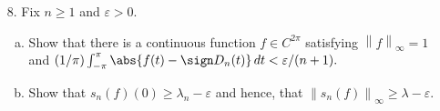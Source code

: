 \documentclass{article}
\begin{document}
\begin{itemize}
\begin{proof}
			Similarly, we have
			\begin{align*}
				b_n &= \frac{1}{\pi} \left( \int_0^{2\pi} \pi^2\sin nx\, dx - 2\pi \int_0^{2\pi} x\sin nx\, dx + \int_0^{2\pi} x^2\sin nx\, dx \right) 
			\end{align*}
			Integrating by parts, we have
			\begin{align*}
				\int_0^{2\pi} x\sin nx\, dx &= \left[ -\frac{x}{n} \cos nx \right]\bigg\vert_0^{2\pi} = -\frac{2\pi}{n} \\
				\int_0^{2\pi} x^2\sin nx\, dx &= \left[-\frac{x^2}{n} \cos nx\right]\bigg\vert_0^{2\pi} - \frac{2}{n}\int_0^{2\pi} -x\cos nx\, dx = -\frac{4\pi^2}{n}
			\end{align*}
			Thus, since $\int_0^{2\pi} \pi^2\sin nx\, dx=0,$ we have
			\begin{align*}
				b_n &= \frac{1}{\pi} \left( -2\pi \cdot \left( -\frac{2\pi}{n} \right) + \left( -\frac{4\pi^2}{n} \right) \right) = 0
			\end{align*}
			so the Fourier series of $(\pi-x)^2$ is given by
			\begin{align*}
				(\pi-x)^2 &= \frac{a_0}{2} + \sum_{n=1}^{\infty} (a_n\cos nx + b_n\sin nx) = \frac{\pi^2}{3} + 4\sum_{n=1}^{\infty} \frac{\cos nx}{n^2}
			\end{align*}
			as desired. Substituting $x=0,$ we have
			\begin{align*}
				\pi^2 &= \frac{\pi^3}{3} + 4\sum_{n=1}^{\infty} \frac{1}{n^2} \implies \sum_{n=1}^{\infty} \frac{1}{n^2}= \frac{\pi^2}{6}
			\end{align*}
		\end{proof}

	\item[8.] Fix $n\ge 1$ and $\varepsilon>0.$
		\begin{enumerate}[(a)]
			\item Show that there is a continuous function $f\in C^{2\pi}$ satisfying $\left\lVert f \right\rVert_\infty=1$ and $(1/\pi) \int_{-\pi}^\pi \abs{f(t)-\sign D_n(t)}\, dt<\varepsilon/(n+1).$

			\item Show that $s_n(f)(0)\ge\lambda_n-\varepsilon$ and hence, that $\left\lVert s_n(f) \right\rVert_\infty\ge \lambda-\varepsilon.$

		\end{enumerate}


\end{itemize}
\end{document}
